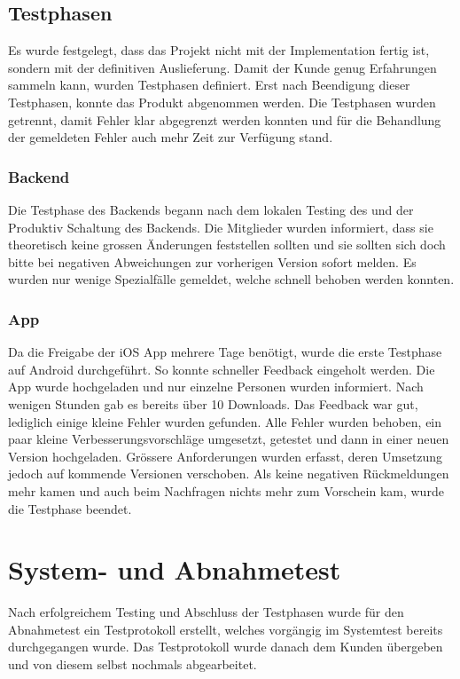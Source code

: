 \subsection{Testphasen}
Es wurde festgelegt, dass das Projekt nicht mit der Implementation fertig ist, sondern mit der definitiven Auslieferung. Damit der Kunde genug Erfahrungen sammeln kann, wurden Testphasen definiert. Erst nach Beendigung dieser Testphasen, konnte das Produkt abgenommen werden. Die Testphasen wurden getrennt, damit Fehler klar abgegrenzt werden konnten und für die Behandlung der gemeldeten Fehler auch mehr Zeit zur Verfügung stand.

\subsubsection{Backend}
Die Testphase des Backends begann nach dem lokalen Testing des  und der Produktiv Schaltung des Backends. Die Mitglieder wurden informiert, dass sie theoretisch keine grossen Änderungen feststellen sollten und sie sollten sich doch bitte bei negativen Abweichungen zur vorherigen Version sofort melden. Es wurden nur wenige Spezialfälle gemeldet, welche schnell behoben werden konnten.

\subsubsection{App}
Da die Freigabe der iOS App mehrere Tage benötigt, wurde die erste Testphase auf Android durchgeführt. So konnte schneller Feedback eingeholt werden. Die App wurde hochgeladen und nur einzelne Personen wurden informiert. Nach wenigen Stunden gab es bereits über 10 Downloads. Das Feedback war gut, lediglich einige kleine Fehler wurden gefunden. Alle Fehler wurden behoben, ein paar kleine Verbesserungsvorschläge umgesetzt, getestet und dann in einer neuen Version hochgeladen. Grössere Anforderungen wurden erfasst, deren Umsetzung jedoch auf kommende Versionen verschoben. Als keine negativen Rückmeldungen mehr kamen und auch beim Nachfragen nichts mehr zum Vorschein kam, wurde die Testphase beendet.

\section{System- und Abnahmetest}
Nach erfolgreichem Testing und Abschluss der Testphasen wurde für den Abnahmetest ein Testprotokoll erstellt, welches vorgängig im Systemtest bereits durchgegangen wurde. Das Testprotokoll wurde danach dem Kunden übergeben und von diesem selbst nochmals abgearbeitet.

